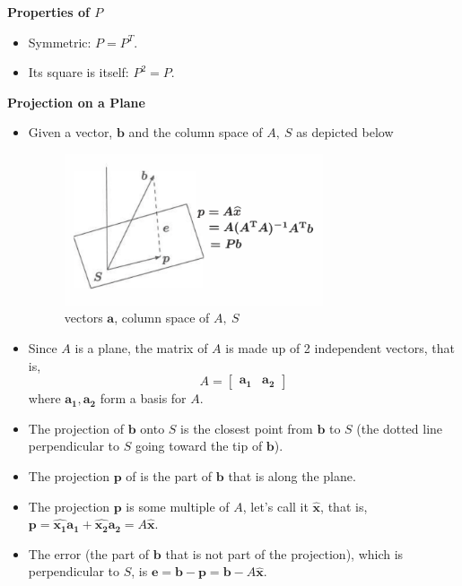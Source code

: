 \documentclass[11pt]{article}
\begin{document}
\textbf{Properties of $P$}
\begin{itemize}
    \item Symmetric: $P=P^T$.
    \item Its square is itself: $P^2=P$.
\end{itemize}

\textbf{Projection on a Plane}
\begin{itemize}
    \item Given a vector, $\boldsymbol{b}$ and the column space of $A, \ S$ as depicted below
    \begin{figure}[H] 
        \centering 
        \includegraphics[width=3in]{imgs/plane_projection.png}
        \caption{vectors $\boldsymbol{a}$, column space of $A, \ S$}
    \end{figure}
    \item Since $A$ is a plane, the matrix of $A$ is made up of 2 independent vectors, that is,
    \[ A= \begin{bmatrix}
        \boldsymbol{a_1} & \boldsymbol{a_2}
    \end{bmatrix} \]
    where $\boldsymbol{a_1}, \boldsymbol{a_2}$ form a basis for $A$.
    \item The projection of $\boldsymbol{b}$ onto $S$ is the closest point from $\boldsymbol{b}
    $ to $S$ (the dotted line perpendicular to $S$ going toward the tip of $\boldsymbol{b}$).
    \item The projection $\boldsymbol{p}$ of is the part of $\boldsymbol{b}$ that is along the 
    plane.
    \item The projection $\boldsymbol{p}$ is some multiple of $A$, let's call it 
    $\boldsymbol{\hat{x}}$, that is, $\boldsymbol{p}=\boldsymbol{\boldsymbol{\hat{x_1}}}
    \boldsymbol{a_1} + \boldsymbol{\hat{x_2}}\boldsymbol{a_2} = 
    A\boldsymbol{\hat{x}}$.
    \item The error (the part of $\boldsymbol{b}$ that is not part of the projection), which is
    perpendicular to $S$, is $\boldsymbol{e} = \boldsymbol{b} - \boldsymbol{p} = 
    \boldsymbol{b} - A\boldsymbol{\hat{x}}$.

\end{itemize}
\end{document}
